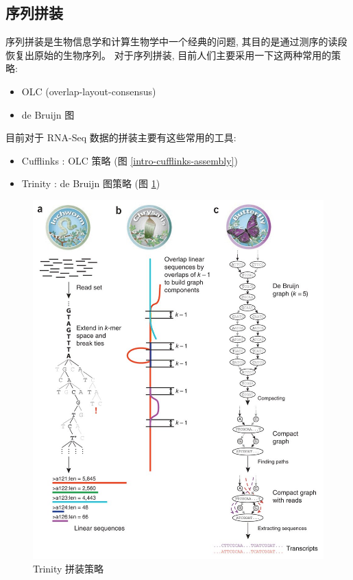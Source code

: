 \subsection{序列拼装}
序列拼装是生物信息学和计算生物学中一个经典的问题, 
其目的是通过测序的读段恢复出原始的生物序列。 对于序列拼装, 目前人们主要采用一下这两种常用的策略: 
\begin{itemize}
\item OLC (overlap-layout-consensus) \cite{greenphrap, bonfield1995new, 
kececioglu1995combinatorial, myers1995toward, huang1999cap3}

\item de Bruijn 图 \cite{pevzner2001eulerian}
\end{itemize}

目前对于 RNA-Seq 数据的拼装主要有这些常用的工具: 
\begin{itemize}
\item Cufflinks \cite{cufflinks.2010}: 
OLC 策略 (图 \ref{intro-cufflinks-assembly})

\item Trinity \cite{grabherr2011full}: 
de Bruijn 图策略 (图 \ref{intro-trinity-assembly})
\end{itemize}

\begin{figure}[!t]
\centering
\includegraphics[width=\textwidth]{figures/trinity-assembly.jpg}
\caption{Trinity 拼装策略 \cite{grabherr2011full}}
\label{intro-trinity-assembly}
\end{figure}

